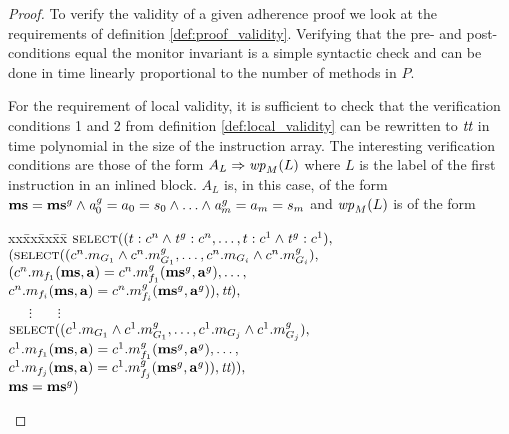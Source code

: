 \documentclass[10pt,twocolumn]{article}
\newcommand{\AND}{\wedge}
\newcommand{\WP}{{\it wp}}
\newcommand{\SELECT}{\mbox{\sc select}}
\newcommand{\ghost}[1]{{\it #1}^g}
\newcommand{\MS}{{\bf ms}}
\newcommand{\True}{\mbox{\it tt}}
\begin{document}
\begin{proof}
To verify the validity of a given adherence proof we look at the requirements of definition \ref{def:proof_validity}. Verifying that the pre- and post-conditions equal the monitor invariant is a simple syntactic check and can be done in time linearly proportional to the number of methods in $P$.

For the requirement of local validity, it is sufficient to check that the verification conditions 1 and 2 from definition \ref{def:local_validity} can be rewritten to $\True$ in time polynomial in the size of the instruction array. The interesting verification conditions are those of the form $A_L \Rightarrow \WP_M(L)$ where $L$ is the label of the first instruction in an inlined block. $A_L$ is, in this case, of the form $ \MS = \MS^g \AND \ghost{a}_0 = a_0 = s_0 \AND \ldots \AND \ghost{a}_m = a_m = s_m $ and $\WP_M(L)$ is of the form 

\begin{tabbing}
xx\=xx\=xx\=xx\= \kill
$\SELECT((t:c^n \AND \ghost{t}:c^n, \ldots, t:c^1 \AND \ghost{t}:c^1),$\\
          \>$(\SELECT((c^n.m_{G_1} \AND c^n.m\ghost{}_{G_1},
                             \ldots,c^n.m_{G_i}\AND c^n.m\ghost{}_{G_i}), $\\
          \>   \>          \>$(c^n.m_{f_1}(\MS, \mathbf{a})
             =c^n.m\ghost{}_{f_1}(\ghost{\MS}, \ghost{\mathbf{a}}),\ldots,$\\
          \>   \>          \>         \> $c^n.m_{f_i}(\MS, 
                      \mathbf{a})=c^n.m\ghost{}_{f_i}(\ghost{\MS}, 
                                             \ghost{\mathbf{a}})), \True),$\\
          \>   \> ~~~$\vdots$ \>      \> ~~~$\vdots$\\
          \>   \>$\SELECT((c^1.m_{G_1} \AND 
                      c^1.m\ghost{}_{G_1},\ldots,c^1.m_{G_j}\AND 
                                                c^1.m\ghost{}_{G_j}), $\\
          \>   \>          \>         \> $c^1.m_{f_1}(\MS, \mathbf{a})=
                               c^1.m\ghost{}_{f_1}(\ghost{\MS}, 
                                        \ghost{\mathbf{a}}),\ldots,$\\
          \>   \>          \>         \> $c^1.m_{f_j}(\MS, \mathbf{a})=
                           c^1.m\ghost{}_{f_j}(\ghost{\MS}, 
                                            \ghost{\mathbf{a}})), \True)), $\\
          \>$\MS = \ghost{\MS})$
\end{tabbing}


\end{proof}
\end{document}
